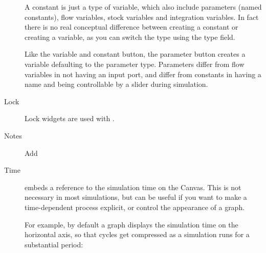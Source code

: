 \begin{description}
A constant is just a type of variable, which also include parameters
(named constants), flow variables, stock variables and integration
variables. In fact there is no real conceptual difference between
creating a constant or creating a variable, as you can switch the
type using the type field.

Like the variable and constant button, the parameter button creates
a variable defaulting to the parameter type. Parameters differ from
flow variables in not having an input port, and differ from constants
in having a name and being controllable by a slider during simulation.
\item [{Lock}] Lock widgets are used with . 
\item [{Notes}] Add 
\item [{Time}]  embeds a reference to the simulation
time on the Canvas. This is not necessary in most simulations, but
can be useful if you want to make a time-dependent process explicit,
or control the appearance of a graph.

For example, by default a graph displays the simulation time on the
horizontal axis, so that cycles get compressed as a simulation runs
for a substantial period:
\begin{center}
\par\end{center}


\end{description}
